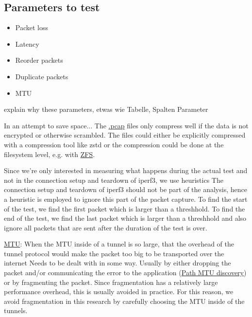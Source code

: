 \subsection{Parameters to test}
\begin{itemize}
  \item Packet loss
  \item Latency
  \item Reorder packets
  \item Duplicate packets
  \item MTU
\end{itemize}
explain why these parameters, etwas wie Tabelle, Spalten Parameter







In an attempt to save space...
The \href{https://en.wikipedia.org/wiki/Pcap}{.pcap} files only compress well if the data is not encrypted or otherwise scrambled.
The files could either be explicitly compressed with a compression tool like zstd or the compression could be done at the filesystem level, e.g. with \href{https://openzfs.org/wiki/Main_Page}{ZFS}.


Since we're only interested in measuring what happens during the actual test and not in the connection setup and teardown of iperf3, we use heuristics
The connection setup and teardown of iperf3 should not be part of the analysis, hence a heuristic is employed to ignore this part of the packet capture. To find the start of the test, we find the first packet which is larger than a threshhold. To find the end of the test, we find the last packet which is larger than a threshhold and also ignore all packets that are sent after the duration of the test is over.

\href{https://en.wikipedia.org/wiki/Maximum_transmission_unit}{MTU}:
When the MTU inside of a tunnel is so large, that the overhead of the tunnel protocol would make the packet too big to be transported over the internet
Needs to be dealt with in some way. Usually by either dropping the packet and/or communicating the error to the application (\href{https://en.wikipedia.org/wiki/Path_MTU_Discovery}{Path MTU discovery}) or by fragmenting the packet. Since fragmentation has a relatively large performance overhead, this is usually avoided in practice. For this reason, we avoid fragmentation in this research by carefully choosing the MTU inside of the tunnels.



